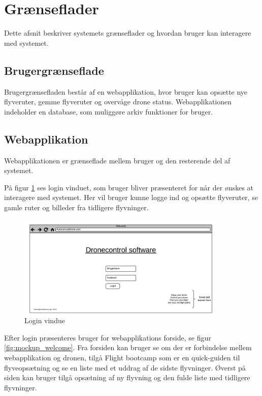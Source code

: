 \section{Grænseflader}
Dette afsnit beskriver systemets grænseflader og hvordan bruger kan interagere med systemet.

\subsection{Brugergrænseflade}
Brugergrænsefladen består af en webapplikation, hvor bruger kan opsætte nye flyveruter, gemme flyveruter og overvåge drone status. Webapplikationen indeholder en database, som muliggøre arkiv funktioner for bruger. 

\subsection{Webapplikation}
Webapplikationen er grænseflade mellem bruger og den resterende del af systemet. 

På figur \ref{fig:mockup_login} ses login vinduet, som bruger bliver præsenteret for når der ønskes at interagere med systemet. Her vil bruger kunne logge ind og opsætte flyveruter, se gamle ruter og billeder fra tidligere flyvninger.

\vspace{-5pt}
\begin{figure}[H]
	\centering
	\includegraphics[width=0.9\textwidth]{Billeder/UI_mockups/login.png}
	\vspace{-5pt}
	\caption{Login vindue}
	\label{fig:mockup_login}
\end{figure}

 \newpage

Efter login præsenteres bruger for webapplikations forside, se figur \ref{fig:mockup_welcome}. 
Fra forsiden kan bruger se om der er forbindelse mellem webapplikation og dronen, tilgå Flight bootcamp som er en quick-guiden til flyveopsætning og se en liste med et uddrag af de sidste flyvninger. Øverst på siden kan bruger tilgå opsætning af ny flyvning og den fulde liste med tidligere flyvninger.

